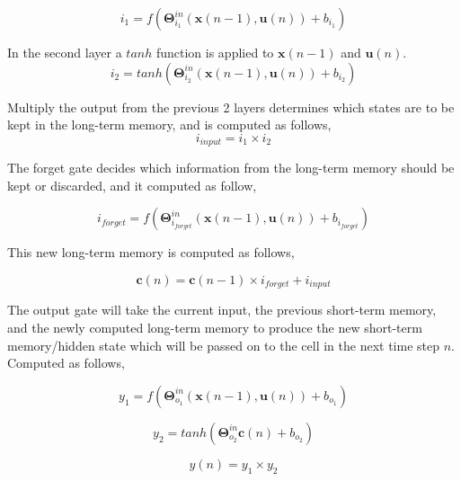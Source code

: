 \documentclass{WitsPhysicsReport}
\begin{document}
\begin{equation}
i_{1} = f(\mathbf{\Theta}^{in}_{i_{1}} (\mathbf{x}(n-1),\mathbf{u}(n) ) + b_{i_{1}} )
\end{equation}

In the second layer a $tanh$ function is applied to $\mathbf{x}(n-1)$ and $\mathbf{u}(n)$.
\begin{equation}
i_{2} = tanh(\mathbf{\Theta}^{in}_{i_{2}} (\mathbf{x}(n-1),\mathbf{u}(n) ) + b_{i_{2}} )
\end{equation}

Multiply the output from the previous 2 layers determines which states are to be kept in the long-term memory, and is computed as follows,
\begin{equation}
i_{input} = i_{1} \times i_{2}
\end{equation}

The forget gate decides which information from the long-term memory should be kept or discarded, and it computed as follow,

\begin{equation}
i_{forget} = f(\mathbf{\Theta}^{in}_{i_{forget}} (\mathbf{x}(n-1),\mathbf{u}(n) ) + b_{i_{forget}} )
\end{equation}

 This new long-term memory is computed as follows,

\begin{equation}
\mathbf{c}(n) = \mathbf{c}(n-1) \times i_{forget} + i_{input}
\end{equation}

The output gate will take the current input, the previous short-term memory, and the newly computed long-term memory to produce the new short-term memory/hidden state which will be passed on to the cell in the next time step $n$. Computed as follows,

\begin{equation}
y_{1} = f(\mathbf{\Theta}^{in}_{o_{1}} (\mathbf{x}(n-1),\mathbf{u}(n) ) + b_{o_{1}} )
\end{equation}

\begin{equation}
y_{2} = tanh(\mathbf{\Theta}^{in}_{o_{2}} \mathbf{c}(n) + b_{o_{2}} )
\end{equation}

\begin{equation}
y(n) = y_{1} \times y_{2}
\end{equation}
\end{document}
